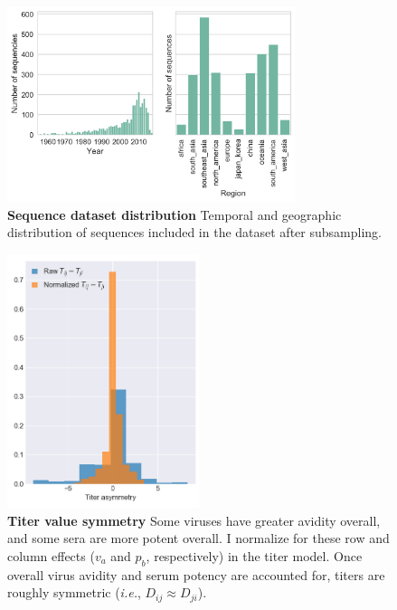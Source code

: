 \begin{figure}[ht!]
\centering
	\includegraphics[width=0.75\textwidth]{./png/sequence_distribution.png}
	\caption[Sequence dataset distribution]{\textbf{Sequence dataset distribution }
  Temporal and geographic distribution of sequences included in the dataset after subsampling.
	}
	\label{sequence_distribution}
\end{figure}

\begin{figure}[ht!]
  \centering
  \includegraphics[width=0.5\textwidth]{./png/titer_asymmetry.png}
  \caption[Titer value symmetry]{\textbf{Titer value symmetry }
  Some viruses have greater avidity overall, and some sera are more potent overall.
  I normalize for these row and column effects ($v_a$ and $p_b$, respectively) in the titer model.
  Once overall virus avidity and serum potency are accounted for, titers are roughly symmetric (\textit{i.e.}, $D_{ij} \approx D_{ji}$).
  }
\label{titer_asymmetry}
\end{figure}

